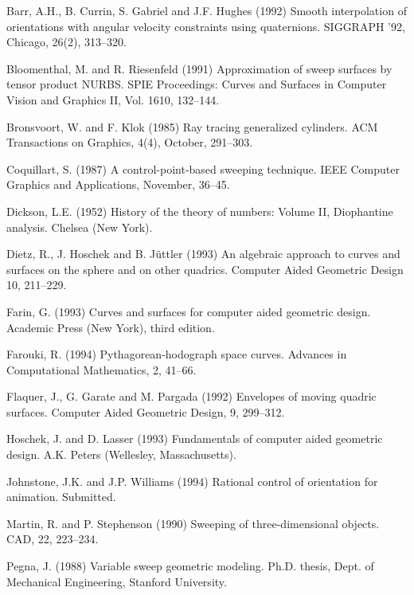 
\begin{thebibliography}{Shoemake 85}

Barr, A.H., B. Currin, S. Gabriel and J.F. Hughes (1992)
Smooth interpolation of orientations with angular velocity
constraints using quaternions.  SIGGRAPH '92, Chicago, 26(2), 313--320.

Bloomenthal, M. and R. Riesenfeld (1991)
Approximation of sweep surfaces by tensor product NURBS.
SPIE Proceedings: Curves and Surfaces in Computer Vision and Graphics II,
Vol. 1610, 132--144.

Bronsvoort, W. and F. Klok (1985)
Ray tracing generalized cylinders.
ACM Transactions on Graphics, 4(4), October, 291--303.

Coquillart, S. (1987)
A control-point-based sweeping technique.
IEEE Computer Graphics and Applications, November, 36--45.

Dickson, L.E. (1952) History of the theory of numbers: Volume II,
Diophantine analysis.  Chelsea (New York).

Dietz, R., J. Hoschek and B. J\"{u}ttler (1993)
An algebraic approach to curves and surfaces on the sphere and on other
quadrics.  Computer Aided Geometric Design 10, 211--229.

Farin, G. (1993) Curves and surfaces for computer aided geometric design.
Academic Press (New York), third edition.

Farouki, R. (1994)
Pythagorean-hodograph space curves.
Advances in Computational Mathematics, 2, 41--66.

Flaquer, J., G. Garate and M. Pargada (1992)
Envelopes of moving quadric surfaces.
Computer Aided Geometric Design, 9, 299--312.

Hoschek, J. and D. Lasser (1993)
Fundamentals of computer aided geometric design.
A.K. Peters (Wellesley, Massachusetts).

Johnstone, J.K. and J.P. Williams (1994) Rational control of orientation
for animation.  Submitted.

Martin, R. and P. Stephenson (1990)
Sweeping of three-dimensional objects.
CAD, 22, 223--234.

Pegna, J. (1988) Variable sweep geometric modeling.
Ph.D. thesis, Dept. of Mechanical Engineering, Stanford University.


\end{thebibliography}
